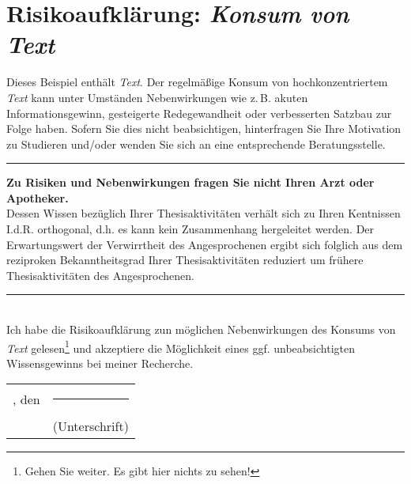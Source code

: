 %
%	
	\section*{Risikoaufklärung: \textit{Konsum von Text}} %
	
	Dieses Beispiel enthält \emph{Text}. Der regelmäßige Konsum von hochkonzentriertem \emph{Text} kann unter Umständen Nebenwirkungen wie z.\,B. akuten Informationsgewinn, gesteigerte Redegewandheit oder verbesserten Satzbau zur Folge haben. Sofern Sie dies nicht beabsichtigen, hinterfragen Sie Ihre Motivation zu Studieren und/oder wenden Sie sich an eine entsprechende Beratungsstelle.
	\\
	
	
	{%
		\hrule
		\vspace{0.2em}
		\footnotesize%
		\sffamily%
		\noindent
		\textbf{Zu Risiken und Nebenwirkungen fragen Sie nicht Ihren Arzt oder Apotheker.}\\Dessen Wissen bezüglich Ihrer Thesisaktivitäten verhält sich zu Ihren Kentnissen I.d.R. orthogonal, d.h. es kann kein Zusammenhang hergeleitet werden. Der Erwartungswert der Verwirrtheit des Angesprochenen ergibt sich folglich aus dem reziproken Bekanntheitsgrad Ihrer Thesisaktivitäten reduziert um frühere Thesisaktivitäten des Angesprochenen.
		\hrule
	}~
	\\
	
	\noindent
	Ich habe die Risikoaufklärung zun möglichen Nebenwirkungen des Konsums von \emph{Text} gelesen\footnote{Gehen Sie weiter. Es gibt hier nichts zu sehen!} und akzeptiere die Möglichkeit eines ggf. unbeabsichtigten Wissensgewinns bei meiner Recherche.
	
	
	\vfill
	\begin{tabular}{l c}
		\ort, den \abgabedatum \hspace*{1cm}& \rule[-2px]{5cm}{0.5px} \\ 
		&\footnotesize{(Unterschrift)}
	\end{tabular}